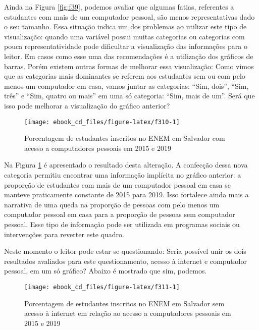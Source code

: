 \documentclass[
  oneside]{book}
\begin{document}
Ainda na Figura \ref{fig:f39}, podemos avaliar que algumas fatias, referentes a estudantes com mais de um computador pessoal, são menos representativas dado o seu tamanho. Essa situação indica um dos problemas ao utilizar este tipo de visualização: quando uma variável possui muitas categorias ou categorias com pouca representatividade pode dificultar a visualização das informações para o leitor. Em casos como esse uma das recomendações é a utilização dos gráficos de barras. Porém existem outras formas de melhorar essa visualização: Como vimos que as categorias mais dominantes se referem aos estudantes sem ou com pelo menos um computador em casa, vamos juntar as categorias: ``Sim, dois'', ``Sim, três'' e ``Sim, quatro ou mais'' em uma só categoria: ``Sim, mais de um''. Será que isso pode melhorar a visualização do gráfico anterior?

\begin{figure}

{\centering \texttt{[image: ebook\_cd\_files/figure-latex/f310-1]} 

}

\caption{Porcentagem de estudantes inscritos no ENEM em Salvador com acesso a computadores pessoais em 2015 e 2019}\label{fig:f310}
\end{figure}

Na Figura \ref{fig:f310} é apresentado o resultado desta alteração. A confecção dessa nova categoria permitiu encontrar uma informação implícita no gráfico anterior: a proporção de estudantes com mais de um computador pessoal em casa se manteve praticamente constante de 2015 para 2019. Isso fortalece ainda mais a narrativa de uma queda na proporção de pessoas com pelo menos um computador pessoal em casa para a proporção de pessoas sem computador pessoal. Esse tipo de informação pode ser utilizada em programas sociais ou intervenções para reverter este quadro.

Neste momento o leitor pode estar se questionando: Seria possível unir os dois resultados avaliados para este questionamento, acesso à internet e computador pessoal, em um só gráfico? Abaixo é mostrado que sim, podemos.

\begin{figure}

{\centering \texttt{[image: ebook\_cd\_files/figure-latex/f311-1]} 

}

\caption{Porcentagem de estudantes inscritos no ENEM em Salvador sem acesso à internet em relação ao acesso a computadores pessoais em 2015 e 2019}\label{fig:f311}
\end{figure}
\end{document}
